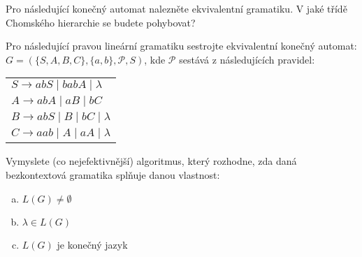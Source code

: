 \documentclass[a4paper,12pt]{amsart}
\begin{document}
\begin{problem}
 
    Pro následující konečný automat nalezněte ekvivalentní gramatiku. V jaké třídě Chomského hierarchie se budete pohybovat?

	\begin{center}
    \end{center}

\end{problem}


\medskip\begin{problem} 
    
    Pro následující pravou lineární gramatiku sestrojte ekvivalentní konečný automat: $G=(\{S,A,B,C\},\{a,b\},\mathcal P,S)$, kde $\mathcal P$ sestává z následujících pravidel: 

    \medskip

    \begin{center}
        \begin{tabular}{l}
        $S\rightarrow abS\mid babA\mid \lambda $\\
        $A\rightarrow abA\mid aB \mid  bC$\\
        $B\rightarrow abS\mid B\mid bC\mid \lambda $\\
        $C\rightarrow aab\mid A\mid aA\mid \lambda $
        \end{tabular}
    \end{center}

\end{problem}


\medskip\begin{problem}
    Vymyslete (co nejefektivnější) algoritmus, který rozhodne, zda daná bezkontextová gramatika splňuje danou vlastnost:

    \medskip
    
    \begin{enumerate}[(a)]
        \item $L(G)\neq\emptyset$
        \item $\lambda\in L(G)$
        \item $L(G)$ je konečný jazyk
    \end{enumerate}

\end{problem}
\end{document}
